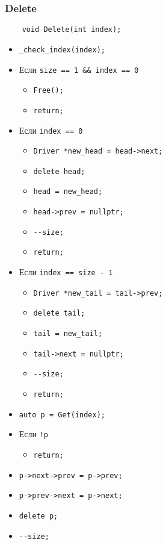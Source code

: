 \subsubsection{Delete}

\begin{lstlisting}
    void Delete(int index);
\end{lstlisting}

\begin{itemize}
    \item \verb|_check_index(index);|
    \item Если \verb|size == 1 && index == 0|
        \begin{itemize}
            \item \verb|Free();|
            \item \verb|return;|
        \end{itemize}
    \item Если \verb|index == 0|
        \begin{itemize}
            \item \verb|Driver *new_head = head->next;|
            \item \verb|delete head;|
            \item \verb|head = new_head;|
            \item \verb|head->prev = nullptr;|
            \item \verb|--size;|
            \item \verb|return;|
        \end{itemize}
    \item Если \verb|index == size - 1|
        \begin{itemize}
            \item \verb|Driver *new_tail = tail->prev;|
            \item \verb|delete tail;|
            \item \verb|tail = new_tail;|
            \item \verb|tail->next = nullptr;|
            \item \verb|--size;|
            \item \verb|return;|
        \end{itemize}
    \item \verb|auto p = Get(index);|
    \item Если \verb|!p|
        \begin{itemize}
            \item \verb|return;|
        \end{itemize}
    \item \verb|p->next->prev = p->prev;|
    \item \verb|p->prev->next = p->next;|
    \item \verb|delete p;|
    \item \verb|--size;|
\end{itemize}

